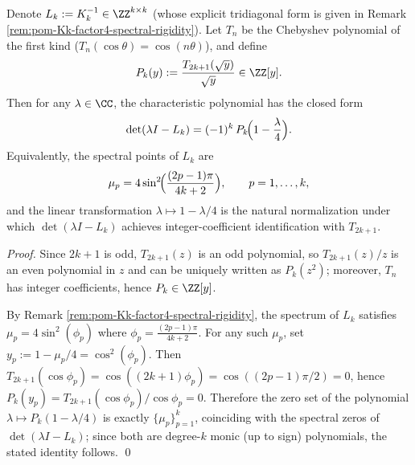 \begin{theorem}\label{thm:pom-Lk-chebyshev-charpoly}
Denote \(L_k:=K_k^{-1}\in\ZZ^{k\times k}\) (whose explicit tridiagonal form is given in Remark \ref{rem:pom-Kk-factor4-spectral-rigidity}).
Let \(T_n\) be the Chebyshev polynomial of the first kind (\(T_n(\cos\theta)=\cos(n\theta)\)), and define
\[
P_k(y):=\frac{T_{2k+1}(\sqrt y)}{\sqrt y}\in\ZZ[y].
\]
Then for any \(\lambda\in\CC\), the characteristic polynomial has the closed form
\[
\det(\lambda I-L_k)=(-1)^k\,P_k\!\Bigl(1-\frac{\lambda}{4}\Bigr).
\]
Equivalently, the spectral points of \(L_k\) are
\[
\mu_p=4\sin^2\!\Bigl(\frac{(2p-1)\pi}{4k+2}\Bigr),\qquad p=1,\dots,k,
\]
and the linear transformation \(\lambda\mapsto 1-\lambda/4\) is the natural normalization under which \(\det(\lambda I-L_k)\) achieves integer-coefficient identification with \(T_{2k+1}\).
\end{theorem}
\begin{proof}
Since \(2k+1\) is odd, \(T_{2k+1}(z)\) is an odd polynomial, so \(T_{2k+1}(z)/z\) is an even polynomial in \(z\) and can be uniquely written as \(P_k(z^2)\); moreover, \(T_n\) has integer coefficients, hence \(P_k\in\ZZ[y]\).
\par
By Remark \ref{rem:pom-Kk-factor4-spectral-rigidity}, the spectrum of \(L_k\) satisfies
\(
\mu_p=4\sin^2(\phi_p)
\)
where \(\phi_p=\frac{(2p-1)\pi}{4k+2}\).
For any such \(\mu_p\), set \(y_p:=1-\mu_p/4=\cos^2(\phi_p)\).
Then \(T_{2k+1}(\cos\phi_p)=\cos((2k+1)\phi_p)=\cos((2p-1)\pi/2)=0\), hence
\(
P_k(y_p)=T_{2k+1}(\cos\phi_p)/\cos\phi_p=0
\).
Therefore the zero set of the polynomial \(\lambda\mapsto P_k(1-\lambda/4)\) is exactly \(\{\mu_p\}_{p=1}^k\), coinciding with the spectral zeros of \(\det(\lambda I-L_k)\);
since both are degree-\(k\) monic (up to sign) polynomials, the stated identity follows. \qed
\end{proof}


